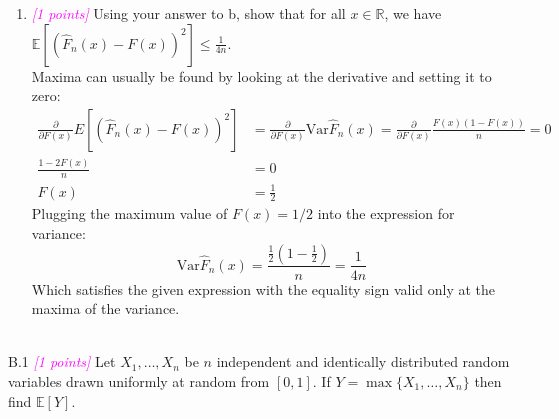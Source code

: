 \documentclass{article}
\newcommand{\field}[1]{\mathbb{#1}}
\newcommand{\1}{\mathbf{1}}
\newcommand{\E}{\mathbb{E}}
\newcommand{\R}{\field{R}} %
\newcommand{\points}[1]{\small\textcolor{magenta}{\emph{[#1 points]}} \normalsize}
\begin{document}
\begin{enumerate}
  \item \points{1} Using your answer to b, show that
    for all $x\in \R$, we have  $\displaystyle \E[ ( \widehat{F}_n(x) - F(x) )^2 ] \leq \tfrac{1}{4n}$.\\
    Maxima can usually be found by looking at the derivative and setting it to zero:
    \begin{align*}
         \frac{\partial}{\partial F(x)} E[ ( \widehat{F}_n(x) - F(x) )^2 ] &= \frac{\partial}{\partial F(x)} \text{Var} \widehat{F}_n(x) = \frac{\partial}{\partial F(x)} \frac{F(x)\left(1-F(x)\right)}{n} = 0 \\
          \frac{1 - 2F(x)}{n} &= 0 \\
          F(x) &= \frac{1}{2}
    \end{align*} 
    Plugging the maximum value of $F(x)=1/2$ into the expression for variance:
    $$\text{Var} \widehat{F}_n(x) = \frac{\frac{1}{2}\left(1-\frac{1}{2}\right)}{n} = \frac{1}{4n} $$
    Which satisfies the given expression with the equality sign valid only at the maxima of the variance. 
    \end{enumerate} \\

B.1  \points{1} Let $X_1,\dots,X_n$ be $n$ independent and identically distributed random variables drawn uniformly at random from $[0,1]$. If $Y = \max\{X_1,\dots,X_n\}$ then find $\E[Y]$.\\
\end{document}
